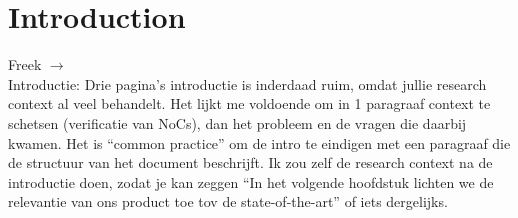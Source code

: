 \chapter*{Introduction}
\begin{tcolorbox}[colback=yellow!30]

Freek $\rightarrow$ \\ 
Introductie: Drie pagina's introductie is inderdaad ruim, omdat jullie research context al veel behandelt. Het lijkt me voldoende om in 1 paragraaf context te schetsen (verificatie van NoCs), dan het probleem en de vragen die daarbij kwamen. Het is ``common practice'' om de intro te eindigen met een paragraaf die de structuur van het document beschrijft. Ik zou zelf de research context na de introductie doen, zodat je kan zeggen ``In het volgende hoofdstuk lichten we de relevantie van ons product toe tov de state-of-the-art'' of iets dergelijks.

\end{tcolorbox}


